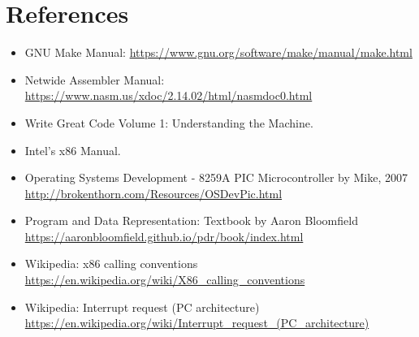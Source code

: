 \chapter*{References}\label{references}

\begin{itemize}
\tightlist
\item
  GNU Make Manual:
  \url{https://www.gnu.org/software/make/manual/make.html}
\item
  Netwide Assembler Manual:
  \url{https://www.nasm.us/xdoc/2.14.02/html/nasmdoc0.html}
\item
  Write Great Code Volume 1: Understanding the Machine.
\item
  Intel's x86 Manual.
\item
  Operating Systems Development - 8259A PIC Microcontroller by Mike,
  2007 \url{http://brokenthorn.com/Resources/OSDevPic.html}
\item
  Program and Data Representation: Textbook by Aaron Bloomfield
  \url{https://aaronbloomfield.github.io/pdr/book/index.html}
\item
  Wikipedia: x86 calling conventions
  \url{https://en.wikipedia.org/wiki/X86_calling_conventions}
\item
  Wikipedia: Interrupt request (PC architecture)
  \url{https://en.wikipedia.org/wiki/Interrupt_request_(PC_architecture)}
\end{itemize}
